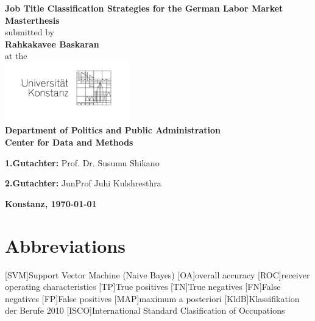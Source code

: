 \documentclass[12pt, a4paper, titlepage]{article}
\begin{document}
\begin{titlepage}
    \begin{center}
    {\LARGE \textbf{Job Title Classification Strategies for the German Labor Market}}
    \\[1cm]
    {\Large \textbf{Masterthesis}}
    \\[1cm]
    {\Large submitted by}
    \\[0.5cm]
    {\LARGE \textbf{Rahkakavee Baskaran}}
    \\[0.5cm]
    {\Large at the}
    \\[0.5cm]
    \includegraphics[width=0.4\textwidth]{logo.jpg}
    \\[1cm]
    {\Large \textbf{Department of Politics and Public Administration}}
    \\[1cm]
    {\Large \textbf{Center for Data and Methods}}
    \\[2cm]
    \begin{minipage}[c]{0.8\textwidth}
    \begin{description}
     \item {\Large \textbf{1.Gutachter:} Prof. Dr. Susumu Shikano}
     \item {\Large \textbf{2.Gutachter:} JunProf Juhi Kulshresthra}
    \end{description}
    \end{minipage}
    \vfill
    {\LARGE \textbf{Konstanz, \today}}
    \end{center}
    \end{titlepage}

\tableofcontents
\newpage


\section*{Abbreviations}
\begin{acronym}
  [SVM]{Support Vector Machine}
  (Naive Bayes)
  [OA]{overall accuracy}
  [ROC]{receiver operating characteristics}
  [TP]{True positives}
  [TN]{True negatives}
  [FN]{False negatives}
  [FP]{False positives}
  [MAP]{maximum a posteriori}
  [KldB]{Klassifikation der Berufe 2010}
  [ISCO]{International Standard Clasification of Occupations}
\end{acronym}
\newpage
\end{document}

